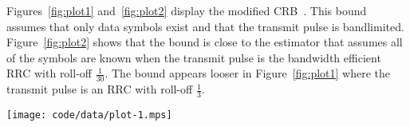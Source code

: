 \documentclass[journal]{IEEEtranTCOM}
\begin{document}
Figures~\ref{fig:plot1} and~\ref{fig:plot2} display the modified CRB~\cite{DAndrea_mod_crb_timing_1994}\cite[Eq.~(6)]{Steendam_low_snr_crb_timing_2001}.  This bound assumes that only data symbols exist and that the transmit pulse is bandlimited.  Figure~\ref{fig:plot2} shows that the bound is close to the estimator that assumes all of the symbols are known when the transmit pulse is the bandwidth efficient RRC with roll-off $\tfrac{1}{30}$.  The bound appears looser in Figure~\ref{fig:plot1} where the transmit pulse is an RRC with roll-off $\tfrac{1}{3}$.




\begin{figure*}[p]
	\centering
		\texttt{[image: code/data/plot-1.mps]}
		\caption{MSE versus SNR with $L=75$ and $2555$.  The number of pilots is $\abs{P} = L/5$.  The transmit pulse is a root raised cosine with roll-off~$\tfrac{1}{3}$.}
		\label{fig:plot1}
\end{figure*}
\end{document}
